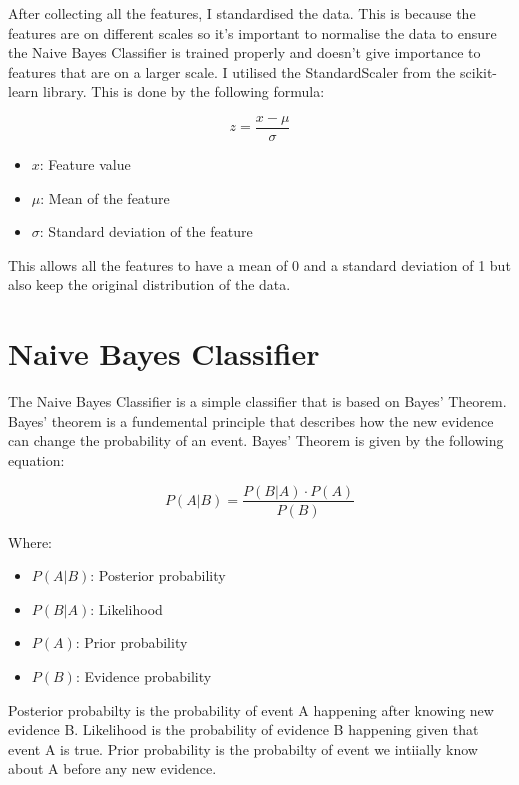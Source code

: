 After collecting all the features, I standardised the data. This is because the features are on different scales so it's important to normalise the data to ensure the Naive Bayes Classifier is trained properly and doesn't give importance to features that are on a larger scale. I utilised the StandardScaler from the scikit-learn library. This is done by the following formula:

\begin{equation}
    \label{eq:standardisation}
    z = \frac{x - \mu}{\sigma}
\end{equation}

\begin{itemize}
    \item $x$: Feature value
    \item $\mu$: Mean of the feature
    \item $\sigma$: Standard deviation of the feature
\end{itemize}

This allows all the features to have a mean of 0 and a standard deviation of 1 but also keep the original distribution of the data.


\section{Naive Bayes Classifier}

The Naive Bayes Classifier is a simple classifier that is based on Bayes' Theorem. Bayes' theorem is a fundemental principle that describes how the new evidence can change the probability of an event. Bayes' Theorem is given by the following equation:

\begin{equation}
    \label{eq:bayes}
    P(A|B) = \frac{P(B|A) \cdot P(A)}{P(B)}
\end{equation}

Where:
\begin{itemize}
    \item $P(A|B)$: Posterior probability
    \item $P(B|A)$: Likelihood
    \item $P(A)$: Prior probability
    \item $P(B)$: Evidence probability 
\end{itemize}

Posterior probabilty is the probability of event A happening after knowing new evidence B. Likelihood is the probability of evidence B happening given that event A is true. Prior probability is the probabilty of event we intiially know about A before any new evidence. 


